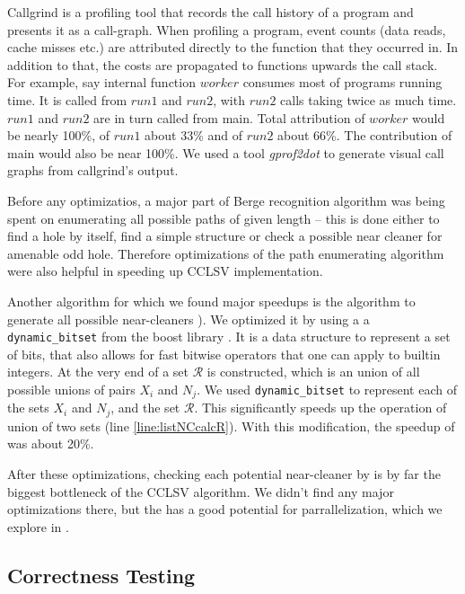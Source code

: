 Callgrind is a profiling tool that records the call history of a program and presents it as a call-graph. When profiling a program, event counts (data reads, cache misses etc.) are attributed directly to the function that they occurred in. In addition to that, the costs are propagated to functions upwards the call stack. For example, say internal function $worker$ consumes most of programs running time. It is called from $run1$ and $run2$, with $run2$ calls taking twice as much time. $run1$ and $run2$ are in turn called from main. Total attribution of $worker$ would be nearly 100\%, of $run1$ about 33\% and of $run2$ about 66\%. The contribution of main would also be near 100\%. We used a tool \emph{gprof2dot} \cite{gprof2dot} to generate visual call graphs from callgrind's output.

Before any optimizatios, a major part of Berge recognition algorithm was being spent on enumerating all possible paths of given length -- this is done either to find a hole by itself, find a simple structure or check a possible near cleaner for amenable odd hole. Therefore optimizations of the path enumerating algorithm were also helpful in speeding up CCLSV implementation.


Another algorithm for which we found major speedups is the algorithm to generate all possible near-cleaners ). We optimized it by using a a \texttt{dynamic\_bitset} from the boost library \cite{boost}. It is a data structure to represent a set of bits, that also allows for fast bitwise operators that one can apply to builtin integers. At the very end of  a set $\mathcal{R}$ is constructed, which is an union of all possible unions of pairs $X_i$ and $N_j$. We used \texttt{dynamic\_bitset} to represent each of the sets $X_i$ and $N_j$, and the set $\mathcal{R}$. This significantly speeds up the operation of union of two sets (line \ref{line:listNCcalcR}). With this modification, the speedup of  was about 20\%.

After these optimizations, checking each potential near-cleaner by  is by far the biggest bottleneck of the CCLSV algorithm. We didn't find any major optimizations there, but the  has a good potential for parrallelization, which we explore in .

\subsection{Correctness Testing}

